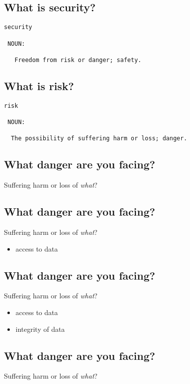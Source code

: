 \documentclass[xga]{xdvislides}
\begin{document}
\subsection{What is security?}
\Huge
\begin{verbatim}
security

 NOUN:

   Freedom from risk or danger; safety.
\end{verbatim}
\Normalsize

\subsection{What is risk?}
\Huge
\begin{verbatim}
risk

 NOUN:

  The possibility of suffering harm or loss; danger.
\end{verbatim}
\Normalsize

\subsection{What danger are you facing?}
Suffering harm or loss of {\em what}?

\subsection{What danger are you facing?}
Suffering harm or loss of {\em what}?

\begin{itemize}
	\item access to data
\end{itemize}

\subsection{What danger are you facing?}
Suffering harm or loss of {\em what}?

\begin{itemize}
	\item access to data
	\item integrity of data
\end{itemize}

\subsection{What danger are you facing?}
Suffering harm or loss of {\em what}?
\end{document}
